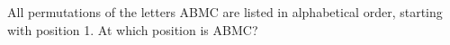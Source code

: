 All permutations of the letters ABMC are listed in alphabetical order, starting with position 1. At which position is ABMC?
